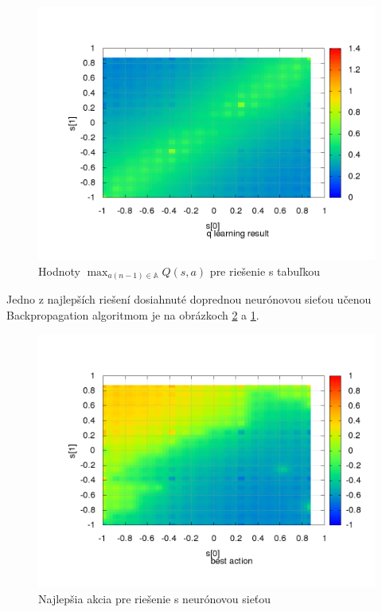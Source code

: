 \begin{figure}[!htb]
\centering
\includegraphics[scale=.4]{../../results_q_learning/experiment_divergence/table/q_map.png}
\caption{Hodnoty $\max_{a(n-1) \in \mathbb{A}} Q(s, a)$ pre riešenie s tabuľkou}
\label{img:divergence_table_q_map}
\end{figure}

Jedno z najlepších riešení dosiahnuté doprednou neurónovou sieťou učenou
Backpropagation algoritmom je na obrázkoch \ref{img:divergence_table_action} a
\ref{img:divergence_table_q_map}.


\begin{figure}[!htb]
\centering
\includegraphics[scale=.4]{../../results_q_learning/experiment_divergence/testing_neuron/q_action.png}
\caption{Najlepšia akcia pre riešenie s neurónovou sieťou}
\label{img:divergence_table_action}
\end{figure}


